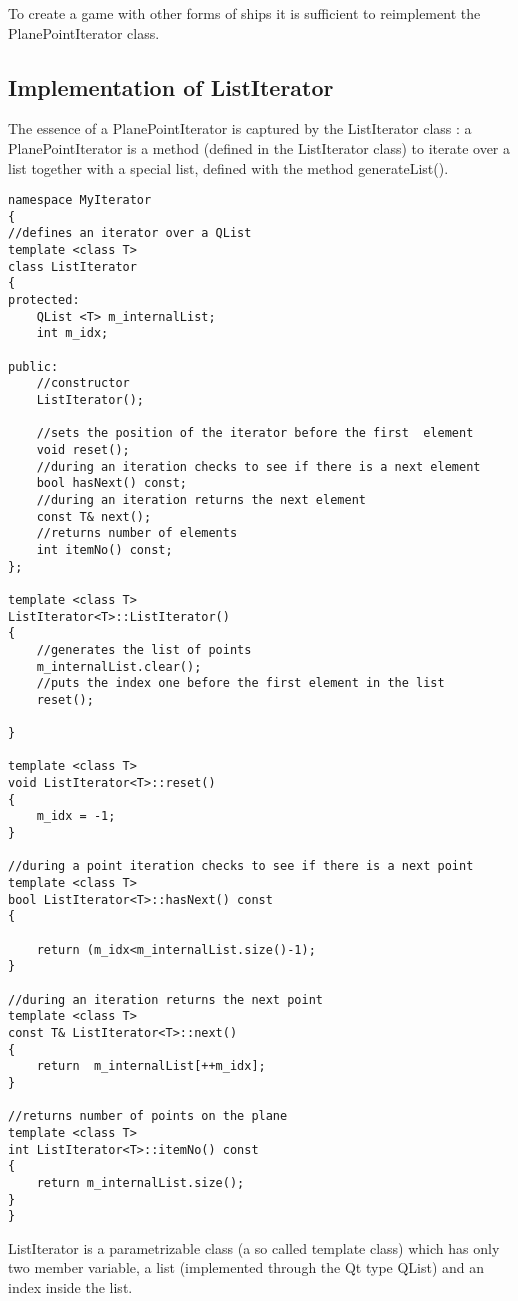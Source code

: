To create a game with other forms of ships it is sufficient to reimplement the PlanePointIterator class.

\subsection {Implementation of ListIterator}

The essence of a PlanePointIterator is captured by the ListIterator class : a PlanePointIterator is a method (defined in the ListIterator class) to iterate over a list together with a special list, defined with the method generateList().

\begin{lstlisting}
namespace MyIterator
{
//defines an iterator over a QList
template <class T>
class ListIterator
{
protected:
    QList <T> m_internalList;
    int m_idx;

public:
    //constructor
    ListIterator();

    //sets the position of the iterator before the first  element
    void reset();
    //during an iteration checks to see if there is a next element
    bool hasNext() const;
    //during an iteration returns the next element
    const T& next();
    //returns number of elements
    int itemNo() const;
};

template <class T>
ListIterator<T>::ListIterator()
{
    //generates the list of points
    m_internalList.clear();
    //puts the index one before the first element in the list
    reset();

}

template <class T>
void ListIterator<T>::reset()
{
    m_idx = -1;
}

//during a point iteration checks to see if there is a next point
template <class T>
bool ListIterator<T>::hasNext() const
{

    return (m_idx<m_internalList.size()-1);
}

//during an iteration returns the next point
template <class T>
const T& ListIterator<T>::next()
{
    return  m_internalList[++m_idx];
}

//returns number of points on the plane
template <class T>
int ListIterator<T>::itemNo() const
{
    return m_internalList.size();
}
}
\end{lstlisting}

ListIterator is a parametrizable class (a so called template class) which has only two member variable, a list (implemented through the Qt type QList) and an index inside the list. 

